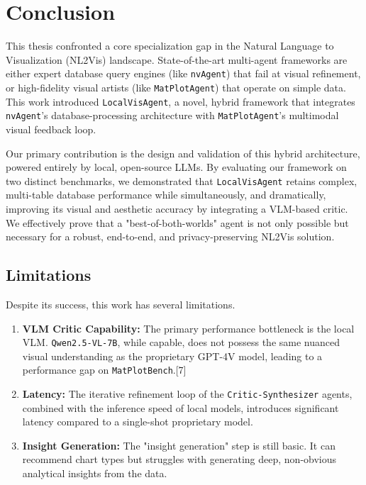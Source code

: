 \documentclass[a4paper,oneside,bibliography=totoc]{scrbook}
\begin{document}
\chapter{Conclusion}

This thesis confronted a core specialization gap in the Natural Language to Visualization (NL2Vis) landscape. State-of-the-art multi-agent frameworks are either expert database query engines (like \texttt{nvAgent}) that fail at visual refinement, or high-fidelity visual artists (like \texttt{MatPlotAgent}) that operate on simple data. This work introduced \texttt{LocalVisAgent}, a novel, hybrid framework that integrates \texttt{nvAgent}'s database-processing architecture with \texttt{MatPlotAgent}'s multimodal visual feedback loop.

Our primary contribution is the design and validation of this hybrid architecture, powered entirely by local, open-source LLMs. By evaluating our framework on two distinct benchmarks, we demonstrated that \texttt{LocalVisAgent} retains complex, multi-table database performance while simultaneously, and dramatically, improving its visual and aesthetic accuracy by integrating a VLM-based critic. We effectively prove that a "best-of-both-worlds" agent is not only possible but necessary for a robust, end-to-end, and privacy-preserving NL2Vis solution.

\section{Limitations}
\label{sec:limitations}
Despite its success, this work has several limitations.
\begin{enumerate}
 \item \textbf{VLM Critic Capability:} The primary performance bottleneck is the local VLM. \texttt{Qwen2.5-VL-7B}, while capable, does not possess the same nuanced visual understanding as the proprietary GPT-4V model, leading to a performance gap on \texttt{MatPlotBench}.[7]
 \item \textbf{Latency:} The iterative refinement loop of the \texttt{Critic-Synthesizer} agents, combined with the inference speed of local models, introduces significant latency compared to a single-shot proprietary model.
 \item \textbf{Insight Generation:} The "insight generation" step is still basic. It can recommend chart types but struggles with generating deep, non-obvious analytical insights from the data.
\end{enumerate}
\end{document}
